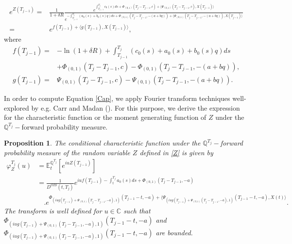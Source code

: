 \documentclass[12pt,a4paper]{article}
\theoremstyle{plain}
\newtheorem{proposition}{Proposition}[section]%
\numberwithin{equation}{section}
\begin{document}
\begin{align}
e^{Z(T_{j-1})}=& \frac{1}{1+\delta R}
\frac{e^{\int_{T_{j-1}}^{T_{j}}c_0(s)ds+
\Phi_{(0,1)}(T_{j}-T_{j-1},c)+
\langle \Psi_{(0,1)}(T_{j}-T_{j-1},c), X(T_{j-1})\rangle}}
{e^{-\int_{T_{j-1}}^{T_{j}}(a_0(s)+b_0(s)q)ds+
\Phi_{(0,1)}(T_{j}-T_{j-1},-(a+bq))+
\langle \Psi_{(0,1)}(T_{j}-T_{j-1},-(a+bq)), X(T_{j-1})\rangle}}\nonumber\\
=& e^{f(T_{j-1})+\langle g(T_{j-1}), X({T_{j-1}})\rangle},
\end{align}
where
\begin{align}
f(T_{j-1}) =& -\ln (1+\delta R) +
\int_{T_{j-1}}^{T_{j}}(c_0(s)+a_0(s)+b_0(s)q)ds\nonumber\\
& +\Phi_{(0,1)}(T_{j}-T_{j-1},c)-\Phi_{(0,1)}(T_{j}-T_{j-1},-(a+bq)),\label{f1}\\
g(T_{j-1})=& \Psi_{(0,1)}(T_{j}-T_{j-1},c)-\Psi_{(0,1)}(T_{j}-T_{j-1},-(a+bq)).\label{g1}
\end{align}

In order to compute Equation \eqref{Cap}, we apply Fourier transform techniques well-explored by e.g. Carr and Madan  (\citeyear*{CarrMadan:1999}). For this purpose, we derive the expression for the  characteristic function  or the moment generating function of $Z$ under the $\mathbb{Q}^{T_j}-$forward probability measure.

\begin{proposition}\label{fcX1X2}
The conditional  characteristic function under the $\mathbb{Q}^{T_j}-$forward probability measure of the random variable   $Z$ defined in  \eqref{Z} is given by
\begin{align*}
\varphi^{T_j}_Z(u)&=\mathbb{E}_t^{\mathbb{Q}^{T_j}}\left[e^{iuZ (T_{j-1})}\right]\\
&=\frac{1}{D^{OIS}(t,T_j)}e^{iuf(T_{j-1})-\int_t^{T_{j}}a_0(s)ds+\Phi_{(0,1)}(T_{j}-T_{j-1},-a)}\\
&\quad .e^{\Phi_{(iug(T_{j-1})+\Psi_{(0,1)}(T_{j}-T_{j-1},-a),1)}(T_{j-1}-t,-a)+\langle \Psi_{(iug(T_{j-1})+\Psi_{(0,1)}(T_{j}-T_{j-1},-a),1)}(T_{j-1}-t,-a),X(t)\rangle
}.
\end{align*}
The transform is well defined for  $u\in\mathbb{C}$ such that $\Phi_{(iug(T_{j-1})+\Psi_{(0,1)}(T_{j}-T_{j-1},-a),1)}(T_{j-1}-t,-a)$ and $\Phi_{(iug(T_{j-1})+\Psi_{(0,1)}(T_{j}-T_{j-1},-a),1)}(T_{j-1}-t,-a)$ are bounded.
\end{proposition}
\end{document}
